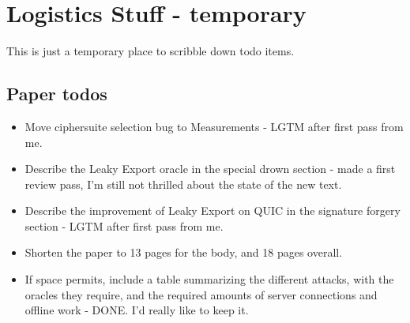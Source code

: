 \documentclass{article}
\begin{document}
\section{Logistics Stuff - temporary}
This is just a temporary place to scribble down todo items.


\subsection{Paper todos}
\begin{itemize}
	\item Move ciphersuite selection bug to Measurements - LGTM after first pass from me.
	\item Describe the Leaky Export oracle in the special drown section - made a first review pass, I'm still not thrilled about the state of the new text.
	\item Describe the improvement of Leaky Export on QUIC in the signature forgery section - LGTM after first pass from me.
	\item Shorten the paper to 13 pages for the body, and 18 pages overall.
	\item If space permits, include a table summarizing the different attacks,
	with the oracles they require, and the required amounts of server connections
	and offline work - DONE. I'd really like to keep it.
\end{itemize}
\end{document}
